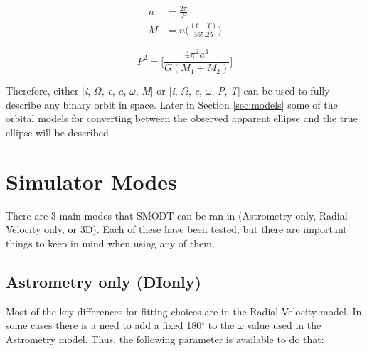 \documentclass[12pt,preprint]{aastex}
\begin{document}
\begin{subequations}
\begin{align}\label{eq:nAndMa}
n &= \frac{2\pi}{P} \\
\label{eq:nAndMb}
M &= n \bigg( \frac{(t-T)}{365.25} \bigg)
\end{align}
\end{subequations}

\begin{equation}\label{eq:KepThird}
P^2 = \bigg[\frac{4\pi^2a^3}{G(M_1+M_2)} \bigg]
\end{equation}

Therefore, either [{\it i}, $\Omega$, {\it e}, {\it a}, $\omega$, {\it M}] or [{\it i}, $\Omega$, {\it e}, $\omega$, {\it P}, {\it T}] can be used to fully describe any binary orbit in space.  Later in Section \ref{sec:models} some of the orbital models for converting between the observed apparent ellipse and the true ellipse will be described. 

\clearpage
\section{Simulator Modes}\label{sec:simModes}

There are 3 main modes that SMODT can be ran in (Astrometry only, Radial Velocity only, or 3D).  Each of these have been tested, but there are important things to keep in mind when using any of them.
\subsection{Astrometry only (DIonly)}
Most of the key differences for fitting choices are in the Radial Velocity model.  In some cases there is a need to add a fixed 180$^{\circ}$ to the $\omega$ value used in the Astrometry model.  Thus, the following parameter is available to do that:
\end{document}

